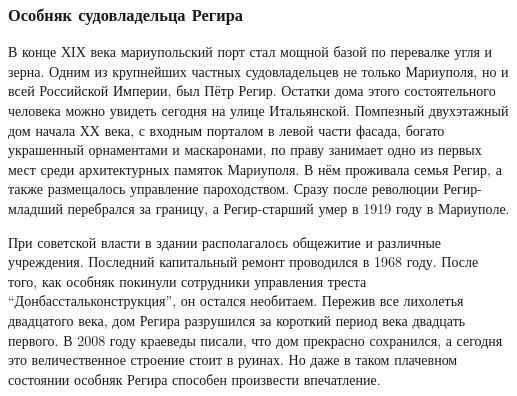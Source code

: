  
 
 
 
 

\subsubsection{Особняк судовладельца Регира}

В конце ХІХ века мариупольский порт стал мощной базой по перевалке угля и
зерна. Одним из крупнейших частных судовладельцев не только Мариуполя, но и
всей Российской Империи, был Пётр Регир. Остатки дома этого состоятельного
человека можно увидеть сегодня на улице Итальянской. Помпезный двухэтажный дом
начала ХХ века, с входным порталом в левой части фасада, богато украшенный
орнаментами и маскаронами, по праву занимает одно из первых мест среди
архитектурных памяток Мариуполя. В нём проживала семья Регир, а также
размещалось управление пароходством. Сразу после революции Регир-младший
перебрался за границу, а Регир-старший умер в 1919 году в Мариуполе.


При советской власти в здании располагалось общежитие и различные учреждения.
Последний капитальный ремонт проводился в 1968 году. После того, как особняк
покинули сотрудники управления треста \enquote{Донбасстальконструкция}, он остался
необитаем. Пережив все лихолетья двадцатого века, дом Регира разрушился за
короткий период века двадцать первого. В 2008 году краеведы писали, что дом
прекрасно сохранился, а сегодня это величественное строение стоит в руинах. Но
даже в таком плачевном состоянии особняк Регира способен произвести
впечатление.

